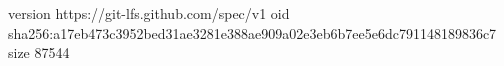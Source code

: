 version https://git-lfs.github.com/spec/v1
oid sha256:a17eb473c3952bed31ae3281e388ae909a02e3eb6b7ee5e6dc791148189836c7
size 87544
